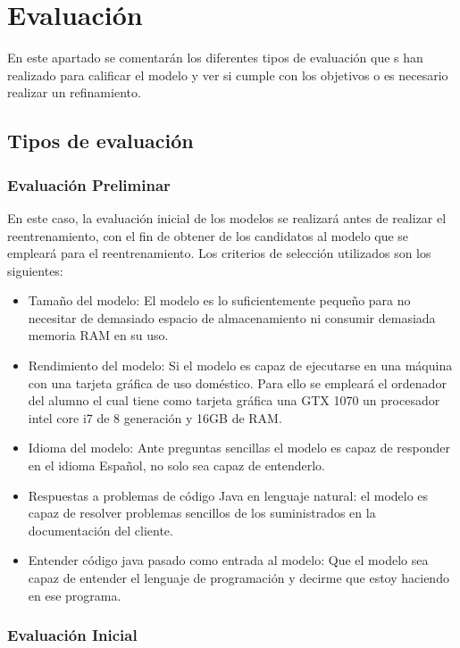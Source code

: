 \chapter{Evaluación}

En este apartado se comentarán los diferentes tipos de evaluación que s han realizado para calificar el modelo y ver si cumple con los objetivos o es necesario realizar un refinamiento.

\section{Tipos de evaluación}

\subsection{Evaluación Preliminar}
\label{cap:evaluacion-inicial}

En este caso, la evaluación inicial de los modelos se realizará antes de realizar el reentrenamiento, con el fin de obtener de los candidatos al modelo que se empleará para el reentrenamiento. Los criterios de selección utilizados son los siguientes:

\begin{itemize}
    \item Tamaño del modelo: El modelo es lo suficientemente pequeño para no necesitar de demasiado espacio de almacenamiento ni consumir demasiada memoria RAM en su uso.
    \item Rendimiento del modelo: Si el modelo es capaz de ejecutarse en una máquina con una tarjeta gráfica de uso doméstico. Para ello se empleará el ordenador del alumno el cual tiene como tarjeta gráfica una GTX 1070 un procesador intel core i7 de 8 generación y 16GB de RAM.
    \item Idioma del modelo: Ante preguntas sencillas el modelo es capaz de responder en el idioma Español, no solo sea capaz de entenderlo.
    \item Respuestas a problemas de código Java en lenguaje natural: el modelo es capaz de resolver problemas sencillos de los suministrados en la documentación del cliente.
    \item Entender código java pasado como entrada al modelo: Que el modelo sea capaz de entender el lenguaje de programación y decirme que estoy haciendo en ese programa.
\end{itemize}

\subsection{Evaluación Inicial}
\label{cap:evaluacion}


